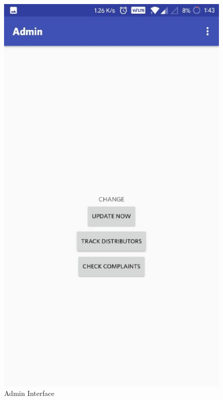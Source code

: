 \begin{figure}[h]
  \begin{center}
\includegraphics[scale=0.6]{3/thirteen.jpeg}
\caption{Admin Interface}
\label{fig:two}
\end{center}
\end{figure}

